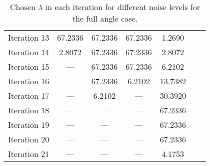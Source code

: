 \begin{table}
\begin{center}
\begin{tabular}{c|ccc|ccc}
      Iteration 13 & 67.2336 & 67.2336 & 67.2336 & 1.2690 &  &  \\
      Iteration 14 & 2.8072 & 67.2336 & 67.2336 & 2.8072 &  &  \\
      Iteration 15 & --- & 67.2336 & 67.2336 & 6.2102 &  &  \\
      Iteration 16 & --- & 67.2336 & 6.2102 & 13.7382 &  &  \\
      Iteration 17 & --- & 6.2102 & --- & 30.3920 &  &  \\
      Iteration 18 & --- & --- & --- & 67.2336 &  &  \\
      Iteration 19 & --- & --- & --- & 67.2336 &  &  \\
      Iteration 20 & --- & --- & --- & 67.2336 &  &  \\
      Iteration 21 & --- & --- & --- & 4.1753 &  &  \\
    \end{tabular}
  \end{center}
  \caption{Chosen $\lambda$ in each iteration for different noise
    levels for the full angle case.}
  \label{tab:chosen_lambda_all_lambda_full_angle}
\end{table}





